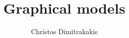 \documentclass{beamer}
\title{Graphical models}
\author[C. Dimitrakakis]{Christos Dimitrakakis}
\begin{document}
\begin{frame}
  \titlepage
\end{frame}


 
\end{document}
